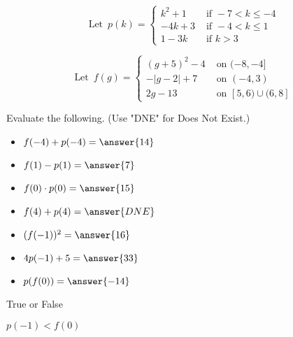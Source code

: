 \documentclass{ximera}
\author{Lee Wayand}
\begin{document}
\[
\text{ Let } \, p(k) = 
\begin{cases}
  k^2 + 1 & \text{ if } -7 < k \leq -4 \\
  -4k + 3 & \text{ if } -4 < k \leq 1 \\
  1 - 3k & \text{ if } k > 3
\end{cases}
\]







\[
\text{ Let } \, f(g) = 
\begin{cases}
  (g+5)^2 - 4 & \text{ on } (-8,-4] \\
  -|g-2|+7 & \text{ on } (-4,3) \\
  2g-13 & \text{ on } [5,6) \cup (6,8]
\end{cases}
\]








\begin{exercise}


Evaluate the following. (Use "DNE" for Does Not Exist.)


\begin{itemize}
\item $f(-4) + p(-4) = \answer{14}$  
\item $f(1) - p(1) = \answer{7}$ 
\item $f(0) \cdot p(0) = \answer{15}$ 
\item $f(4) + p(4) = \answer{DNE}$ 
\item $(f(-1))^2 = \answer{16}$ 
\item $4 p(-1)+5 = \answer{33}$ 
\item $p(f(0)) = \answer{-14}$ 
\end{itemize}

\end{exercise}








\begin{exercise} True or False

$p(-1) < f(0)$


\begin{multipleChoice}
\end{multipleChoice}

\end{exercise}
\end{document}
